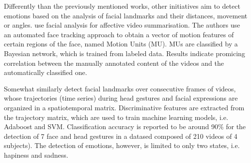 
Differently than the previously mentioned works, other initiatives aim to detect emotions based on the analysis of facial landmarks and their distances, movement or angles. \textcite{joho2009exploiting} use facial analysis for affective video summarisation. The authors use an automated face tracking approach to obtain a vector of motion features of certain regions of the face, named Motion Units (MU). MUs are classified by a Bayesian network, which is trained from labeled data. Results indicate promicing correlation between the manually annotated content of the videos and the automatically classified one.

Somewhat similarly \textcite{akakin2010spatiotemporal} detect facial landmarks over consecutive frames of videos, whose trajectories (time series) during head gestures and facial expressions are organized in a spatiotemporal matrix. Discriminative features are extracted from the trajectory matrix, which are used to train machine learning models, i.e. Adaboost and SVM. Classification accuracy is reported to be around 90\% for the detection of 7 face and head gestures in a datased composed of 210 videos of 4 subjects). The detection of emotions, however, is limited to only two states, i.e. hapiness and sadness.

